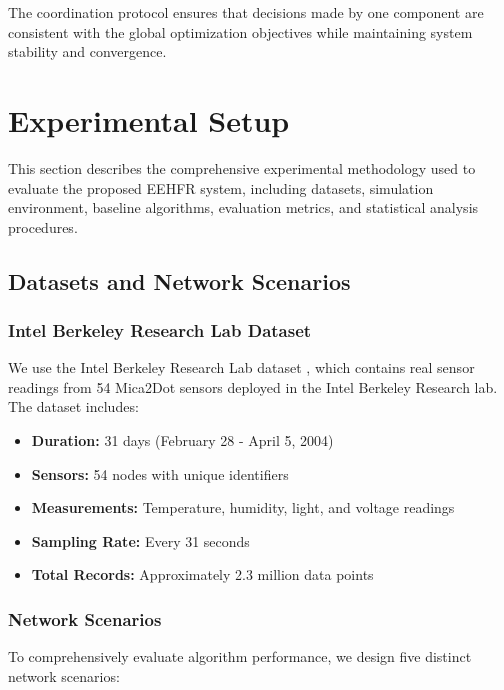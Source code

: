 \documentclass[conference]{IEEEtran}
\begin{document}
The coordination protocol ensures that decisions made by one component are consistent with the global optimization objectives while maintaining system stability and convergence.



\section{Experimental Setup}

This section describes the comprehensive experimental methodology used to evaluate the proposed EEHFR system, including datasets, simulation environment, baseline algorithms, evaluation metrics, and statistical analysis procedures.

\subsection{Datasets and Network Scenarios}

\subsubsection{Intel Berkeley Research Lab Dataset}

We use the Intel Berkeley Research Lab dataset \cite{intel_dataset}, which contains real sensor readings from 54 Mica2Dot sensors deployed in the Intel Berkeley Research lab. The dataset includes:

\begin{itemize}
    \item \textbf{Duration:} 31 days (February 28 - April 5, 2004)
    \item \textbf{Sensors:} 54 nodes with unique identifiers
    \item \textbf{Measurements:} Temperature, humidity, light, and voltage readings
    \item \textbf{Sampling Rate:} Every 31 seconds
    \item \textbf{Total Records:} Approximately 2.3 million data points
\end{itemize}

\subsubsection{Network Scenarios}

To comprehensively evaluate algorithm performance, we design five distinct network scenarios:
\end{document}
